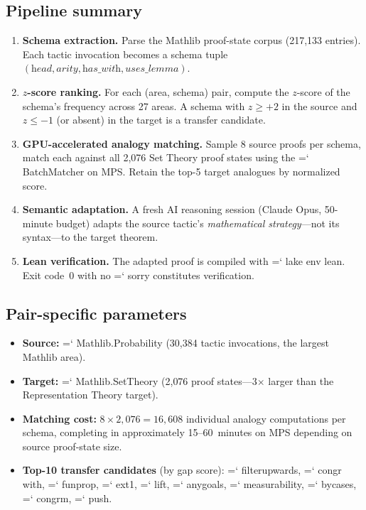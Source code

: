 \documentclass[11pt]{article}
\renewcommand{\texttt}[1]{%
  \begingroup\ttfamily\hyphenchar\font=`\-\relax
  \def\_{\textunderscore\discretionary{}{}{}}%
  #1\endgroup}
\theoremstyle{definition}
\theoremstyle{remark}
\begin{document}
\subsection{Pipeline summary}

\begin{enumerate}
\item \textbf{Schema extraction.}  Parse the Mathlib proof-state
  corpus (217{,}133 entries).  Each tactic invocation becomes a schema
  tuple $(\textit{head}, \textit{arity}, \textit{has\_with},
  \textit{uses\_lemma})$.

\item \textbf{$z$-score ranking.}  For each (area, schema) pair,
  compute the $z$-score of the schema's frequency across 27 areas.
  A schema with $z \geq +2$ in the source and $z \leq -1$ (or absent)
  in the target is a transfer candidate.

\item \textbf{GPU-accelerated analogy matching.}  Sample 8 source
  proofs per schema, match each against all 2{,}076 Set Theory proof
  states using the \texttt{BatchMatcher} on MPS.  Retain the top-5
  target analogues by normalized score.

\item \textbf{Semantic adaptation.}  A fresh AI reasoning session
  (Claude Opus, 50-minute budget) adapts the source tactic's
  \emph{mathematical strategy}---not its syntax---to the target
  theorem.

\item \textbf{Lean verification.}  The adapted proof is compiled
  with \texttt{lake env lean}.  Exit code~0 with no \texttt{sorry}
  constitutes verification.
\end{enumerate}

\subsection{Pair-specific parameters}

\begin{itemize}
\item \textbf{Source:} \texttt{Mathlib.Probability} (30{,}384 tactic
  invocations, the largest Mathlib area).
\item \textbf{Target:} \texttt{Mathlib.SetTheory} (2{,}076 proof
  states---3$\times$ larger than the Representation Theory target).
\item \textbf{Matching cost:} $8 \times 2{,}076 = 16{,}608$
  individual analogy computations per schema, completing in
  approximately 15--60~minutes on MPS depending on source proof-state
  size.
\item \textbf{Top-10 transfer candidates} (by gap score):
  \texttt{filter\_upwards}, \texttt{congr\,with}, \texttt{fun\_prop},
  \texttt{ext1}, \texttt{lift}, \texttt{any\_goals},
  \texttt{measurability}, \texttt{by\_cases}, \texttt{congrm},
  \texttt{push}.
\end{itemize}
\end{document}
